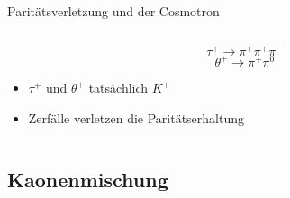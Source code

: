 \documentclass[aspectratio=1610, professionalfonts, 9pt, t]{beamer}
\begin{document}
\begin{frame}{Paritätsverletzung und der Cosmotron}
\begin{columns}[onlytextwidth]
\begin{column}{0.5\textwidth}
\begin{itemize}
\begin{equation*}
            \tau^{+} \rightarrow \pi^{+} \pi^{+} \pi^{-}
          \end{equation*}
          \begin{equation*}
            \theta^{+} \rightarrow \pi^{+} \pi^{0}
          \end{equation*}
          \item $\tau^{+}$ und $\theta^{+}$ tatsächlich $K^{+}$
          \item[\rightarrow] Zerfälle verletzen die Paritätserhaltung
        \end{itemize}
      \end{column}
    \end{columns}
  \end{frame}

\subsection{Kaonenmischung}
\end{document}
